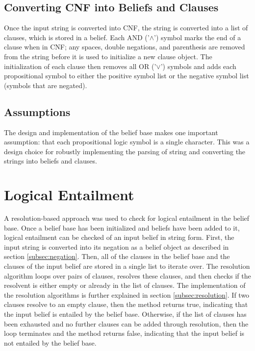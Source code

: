 \documentclass[a4paper,10pt]{article}
\begin{document}
\subsection{Converting CNF into Beliefs and Clauses}
\label{subsec:implementation}
Once the input string is converted into CNF, the string is converted into a list of clauses, which is stored in a belief. Each AND ('$\wedge$') symbol marks the end of a clause when in CNF; any spaces, double negations, and parenthesis are removed from the string before it is used to initialize a new clause object. The initialization of each clause then removes all OR ('$\vee$') symbols and adds each propositional symbol to either the positive symbol list or the negative symbol list (symbols that are negated).

\subsection{Assumptions}
\label{subsec:assumptions}
The design and implementation of the belief base makes one important assumption: that each propositional logic symbol is a single character. This was a design choice for robustly implementing the parsing of string and converting the strings into beliefs and clauses.

\section{Logical Entailment}
\label{sec:entail}
A resolution-based approach was used to check for logical entailment in the belief base. Once a belief base has been initialized and beliefs have been added to it, logical entailment can be checked of an input belief in string form. First, the input string is converted into its negation as a belief object as described in section \ref{subsec:negation}. Then, all of the clauses in the belief base and the clauses of the input belief are stored in a single list to iterate over. The resolution algorithm loops over pairs of clauses, resolves these clauses, and then checks if the resolvent is either empty or already in the list of clauses. The implementation of the resolution algorithms is further explained in section \ref{subsec:resolution}. If two clauses resolve to an empty clause, then the method returns true, indicating that the input belief is entailed by the belief base. Otherwise, if the list of clauses has been exhausted and no further clauses can be added through resolution, then the loop terminates and the method returns false, indicating that the input belief is not entailed by the belief base.
\end{document}
